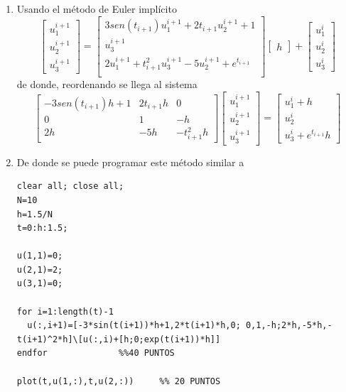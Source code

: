 \documentclass[legalpaper,11pt]{article}
\begin{document}
\begin{enumerate}
\begin{enumerate}
\item Usando el m\'etodo de Euler impl\'icito
$$
\begin{bmatrix}
u_1^{i+1}\\ u_2^{i+1}\\ u_3^{i+1}
\end{bmatrix}
=
\begin{bmatrix}
3sen(t_{i+1})u_1^{i+1}+2t_{i+1}u_2^{i+1}+1\\
u_3^{i+1}\\
2u_1^{i+1}+t_{i+1}^2u_3^{i+1}-5u_2^{i+1}+e^{t_{i+1}}\\
\end{bmatrix}
\begin{bmatrix}
h
\end{bmatrix}
+
\begin{bmatrix}
u_1^{i}\\ u_2^{i}\\ u_3^{i}
\end{bmatrix}
$$
de donde, reordenando se llega al sistema
$$
\begin{bmatrix}
-3sen(t_{i+1})h+1 	& 2t_{i+1}h	& 0 \\
0					& 1 		& -h\\
2h					& -5h		&-t_{i+1}^2h
\end{bmatrix}
\begin{bmatrix}
u_1^{i+1}\\u_2^{i+1}\\u_3^{i+1}
\end{bmatrix}
=
\begin{bmatrix}
u_1^{i}+h\\u_2^{i}\\u_3^{i}+e^{t_{i+1}}h
\end{bmatrix}
$$
\hfill{}

\item De donde se puede programar este m\'etodo similar a
\begin{lstlisting}
clear all; close all;
N=10
h=1.5/N
t=0:h:1.5;

u(1,1)=0;
u(2,1)=2;
u(3,1)=0;

for i=1:length(t)-1
  u(:,i+1)=[-3*sin(t(i+1))*h+1,2*t(i+1)*h,0; 0,1,-h;2*h,-5*h,-t(i+1)^2*h]\[u(:,i)+[h;0;exp(t(i+1))*h]]
endfor				%%40 PUNTOS

plot(t,u(1,:),t,u(2,:))		%% 20 PUNTOS
\end{lstlisting}
 
\end{enumerate}
\end{enumerate}
\end{document}
